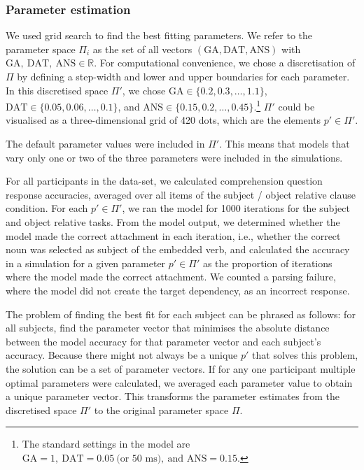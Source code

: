 \documentclass{cambridge7A}\usepackage[]{graphicx}\usepackage[]{color}
\begin{document}
\subsubsection{Parameter estimation}

We used grid search to find the best fitting parameters. We refer to the parameter space $\Pi_i$ as the set of all vectors $(\text{GA}, \text{DAT}, \text{ANS})$ with $\text{GA},\ \text{DAT},\ \text{ANS} \in \mathbb{R}$.
For computational convenience, we chose a discretisation of $\Pi$ by defining a step-width and lower and upper boundaries for each parameter. In this discretised space $\Pi'$, we chose $\text{GA} \in \{0.2, 0.3, \ldots, 1.1\}$, $\text{DAT} \in \{0.05, 0.06, \ldots, 0.1\}$, and $\text{ANS} \in \{0.15, 0.2, \ldots, 0.45\}$.\footnote{The standard settings in the \cite{LewisVasishth2005} model are $\text{GA} = 1,\ \text{DAT} = 0.05\ \text{(or 50 ms)},\ \text{and ANS} = 0.15$.} $\Pi'$ could be visualised as a three-dimensional grid of 420 dots, which are the elements $p' \in \Pi'$.

The default parameter values were included in $\Pi'$. This means that models that vary only one or two of the three parameters were included in the simulations. 


For all participants in the \cite{CaplanEtAl2015} data-set, we calculated comprehension question response accuracies, averaged over all items of the subject / object relative clause condition. For each $p' \in \Pi'$, we ran the model for 1000 iterations for the subject and object relative tasks.
From the model output, we determined whether the model made the correct attachment in each iteration, i.e., whether the correct noun was selected as subject of the embedded verb, and calculated the accuracy in a simulation for a given parameter $p' \in \Pi'$ as the proportion of iterations where the model made the correct attachment. We counted a parsing failure, where the model did not create the target dependency, as an incorrect response.

The problem of finding the best fit for each subject can be phrased as follows: for all subjects, find the parameter vector that minimises the absolute distance between the model accuracy for that parameter vector and each subject's accuracy. Because there might not always be a unique $p'$ that solves this problem, the solution can be a set of parameter vectors.
If for any one participant multiple optimal parameters were calculated, we averaged each parameter value to obtain a unique parameter vector. This transforms the parameter estimates from the discretised space $\Pi'$ to the original parameter space $\Pi$.
\end{document}
